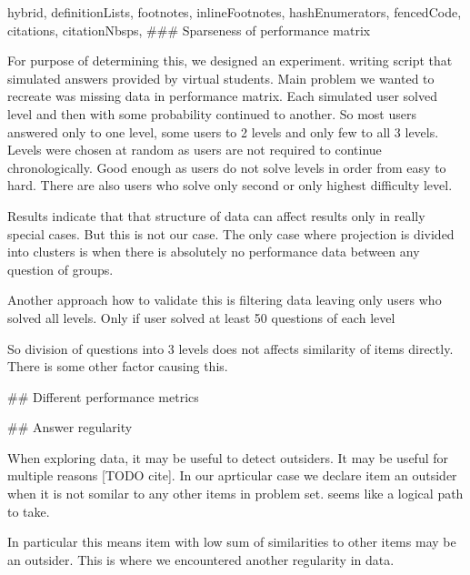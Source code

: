 \documentclass[
  digital, %
  table,   %
  nolof,     %
  nolot,     %
  nocover
]{fithesis3}
\begin{document}
\begin{markdown*}{%
  hybrid,
  definitionLists,
  footnotes,
  inlineFootnotes,
  hashEnumerators,
  fencedCode,
  citations,
  citationNbsps,
}
### Sparseness of performance matrix


For purpose of determining this, we designed an experiment.
writing script that simulated answers provided by virtual students. Main problem we wanted to recreate was missing data in performance matrix. Each simulated user solved level and then with some probability continued to another. So most users answered only to one level, some users to 2 levels and only few to all 3 levels. Levels were chosen at random as users are not required to continue chronologically. Good enough as users do not solve levels in order from easy to hard. There are also users who solve only second or only highest difficulty level.

Results indicate that that structure of data can affect results only in really special cases. But this is not our case. The only case where projection is divided into clusters is when there is absolutely no performance data between any question of groups.


Another approach how to validate this is filtering data leaving only users who solved all levels.
Only if user solved at least 50 questions of each level

So division of questions into 3 levels does not affects similarity of items directly. There is some other factor causing this.

## Different performance metrics



## Answer regularity


When exploring data, it may be useful to detect outsiders. It may be useful for multiple reasons [TODO cite]. In our aprticular case we declare item an outsider when it is not somilar to any other items in problem set.
seems like a logical path to take.

In particular this means item with low sum of similarities to other items may be an outsider. This is where we encountered another regularity in data.


\end{markdown*}
\end{document}
